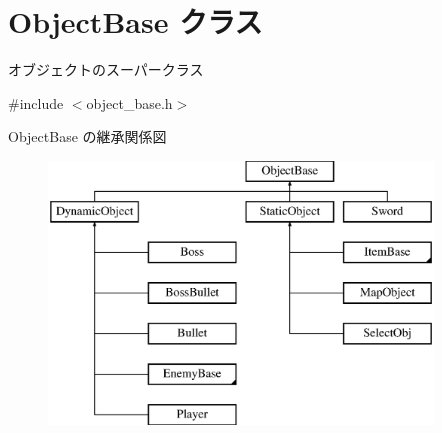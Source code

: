 \hypertarget{class_object_base}{}\section{Object\+Base クラス}
\label{class_object_base}


オブジェクトのスーパークラス  




{\ttfamily \#include $<$object\+\_\+base.\+h$>$}

Object\+Base の継承関係図\begin{figure}[H]
\begin{center}
\leavevmode
\includegraphics[height=7.000000cm]{class_object_base}
\end{center}
\end{figure}
